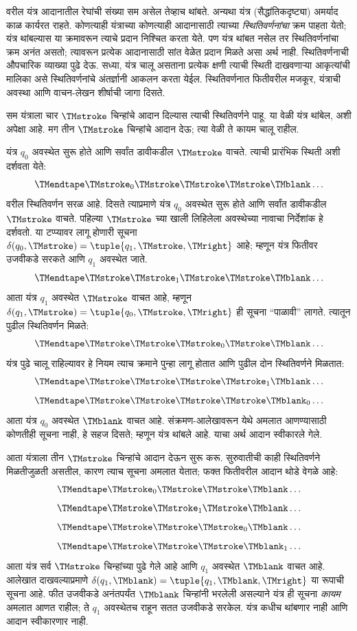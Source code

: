 \documentclass[../../../include/open-logic-section]{subfiles}
\begin{document}
\begin{explain}
वरील यंत्र आदानातील रेघांची संख्या सम असेल तेव्हाच थांबते.
अन्यथा यंत्र (सैद्धांतिकदृष्ट्या) अमर्याद काळ कार्यरत राहते.
कोणत्याही यंत्राच्या कोणत्याही आदानासाठी त्याच्या \emph{स्थितिवर्णनांचा}
क्रम पाहता येतो; यंत्र थांबल्यास या क्रमावरून त्याचे प्रदान निश्चित
करता येते. पण यंत्र थांबत नसेल तर स्थितिवर्णनांचा क्रम अनंत असतो;
त्यावरून प्रत्येक आदानासाठी सांत वेळेत प्रदान मिळते असा अर्थ नाही.
%
स्थितिवर्णनाची औपचारिक
व्याख्या पुढे देऊ. सध्या, यंत्र चालू असताना प्रत्येक क्षणी त्याची
स्थिती दाखवणाऱ्या आकृत्यांची मालिका असे स्थितिवर्णनांचे अंतर्ज्ञानी
आकलन करता येईल. स्थितिवर्णनात फितीवरील मजकूर, यंत्राची अवस्था
आणि वाचन-लेखन शीर्षाची जागा दिसते.

सम यंत्राला चार $\TMstroke$ चिन्हांचे आदान दिल्यास त्याची
स्थितिवर्णने पाहू. या वेळी यंत्र थांबेल, अशी अपेक्षा आहे. मग
तीन $\TMstroke$ चिन्हांचे आदान देऊ; त्या वेळी ते कायम चालू राहील.

यंत्र $q_0$ अवस्थेत सुरू होते आणि सर्वांत डावीकडील $\TMstroke$
वाचते. त्याची प्रारंभिक स्थिती अशी दर्शवता येते:
\[
\TMendtape \TMstroke_0 \TMstroke \TMstroke \TMstroke \TMblank \ldots
\]
वरील स्थितिवर्णन सरळ आहे. दिसते त्याप्रमाणे यंत्र $q_0$ अवस्थेत
सुरू होते आणि सर्वांत डावीकडील $\TMstroke$ वाचते. पहिल्या
%
$\TMstroke$ च्या खाली लिहिलेला अवस्थेच्या नावाचा निर्देशांक हे
दर्शवतो. या टप्प्यावर लागू होणारी सूचना
$\delta(q_0, \TMstroke) = \tuple{q_1, \TMstroke, \TMright}$ आहे;
म्हणून यंत्र फितीवर उजवीकडे सरकते आणि $q_1$ अवस्थेत जाते.
\[
\TMendtape \TMstroke \TMstroke_1 \TMstroke \TMstroke \TMblank \ldots
\]
आता यंत्र $q_1$ अवस्थेत $\TMstroke$ वाचत आहे, म्हणून
$\delta(q_1, \TMstroke) = \tuple{q_0,
  \TMstroke, \TMright}$ ही सूचना ``पाळावी'' लागते. त्यातून पुढील
स्थितिवर्णन मिळते:
\[
\TMendtape \TMstroke \TMstroke \TMstroke_0 \TMstroke \TMblank \ldots
\]
यंत्र पुढे चालू राहिल्यावर हे नियम त्याच क्रमाने पुन्हा लागू होतात
आणि पुढील दोन स्थितिवर्णने मिळतात:
\[
\TMendtape \TMstroke \TMstroke \TMstroke \TMstroke_1 \TMblank \ldots
\]
\[
\TMendtape \TMstroke \TMstroke \TMstroke \TMstroke \TMblank_0 \ldots
\]
आता यंत्र $q_0$ अवस्थेत $\TMblank$ वाचत आहे. संक्रमण-आलेखावरून
येथे अमलात आणण्यासाठी कोणतीही सूचना नाही, हे सहज दिसते;
म्हणून यंत्र थांबले आहे. याचा अर्थ आदान स्वीकारले गेले.

आता यंत्राला तीन $\TMstroke$ चिन्हांचे आदान देऊन सुरू करू.
सुरुवातीची काही स्थितिवर्णने मिळतीजुळती असतील, कारण त्याच सूचना
अमलात येतात; फक्त फितीवरील आदान थोडे वेगळे आहे:
\[
\TMendtape \TMstroke_0 \TMstroke \TMstroke \TMblank \ldots
\]
\[
\TMendtape \TMstroke \TMstroke_1 \TMstroke \TMblank \ldots
\]
\[
\TMendtape \TMstroke \TMstroke \TMstroke_0 \TMblank \ldots
\]
\[
\TMendtape \TMstroke \TMstroke \TMstroke \TMblank_1 \ldots
\]
आता यंत्र सर्व $\TMstroke$ चिन्हांच्या पुढे गेले आहे आणि $q_1$
अवस्थेत $\TMblank$ वाचत आहे. आलेखात दाखवल्याप्रमाणे
$\delta(q_1, \TMblank) =\tuple{q_1,
\TMblank, \TMright}$ या रूपाची सूचना आहे. फीत उजवीकडे अनंतपर्यंत
$\TMblank$ चिन्हांनी भरलेली असल्याने यंत्र ही सूचना \emph{कायम}
अमलात आणत राहील; ते $q_1$ अवस्थेतच राहून सतत उजवीकडे सरकेल.
यंत्र कधीच थांबणार नाही आणि आदान स्वीकारणार नाही.
\end{explain}
\end{document}
